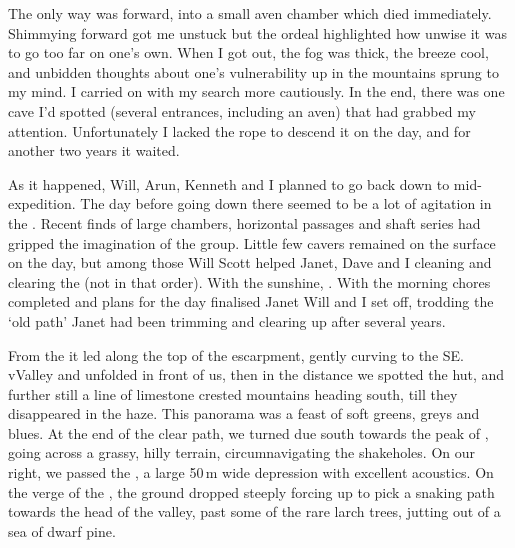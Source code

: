 The only way was forward, into a small aven chamber which died immediately. Shimmying forward got me unstuck but the ordeal highlighted how unwise it was to go too far on one's own. When I got out, the fog was thick, the breeze cool, and unbidden thoughts about one's vulnerability up in the mountains sprung to my mind. I carried on with my search more cautiously. In the end, there was one cave I'd spotted (several entrances, including an aven) that had grabbed my attention. Unfortunately I lacked the rope to descend it on the day, and for another two years it waited.

As it happened, Will, Arun, Kenneth and I planned to go back down to  mid-expedition. The day before going down there seemed to be a lot of agitation in the . Recent finds of large chambers, horizontal passages and shaft series had gripped the imagination of the group. Little few cavers remained on the surface on the day, but among those Will Scott helped Janet, Dave and I cleaning and clearing the  (not in that order). With the sunshine, . With the morning chores completed and plans for the day finalised Janet Will and I set off, trodding the `old  path' Janet had been trimming and clearing up after several years. 

From the  it led along the top of the  escarpment, gently curving to the SE. vValley and  unfolded in front of us, then in the distance we spotted the  hut, and further still a line of limestone crested mountains heading south, till they disappeared in the haze. This panorama was a feast of soft greens, greys and blues. At the end of the clear path, we turned due south towards the peak of , going across a grassy, hilly terrain, circumnavigating the shakeholes. On our right, we passed the , a large 50\,m wide depression with excellent acoustics. On the verge of the , the ground dropped steeply forcing up to pick a snaking path towards the head of the valley, past some of the rare larch trees, jutting out of a sea of dwarf pine.

